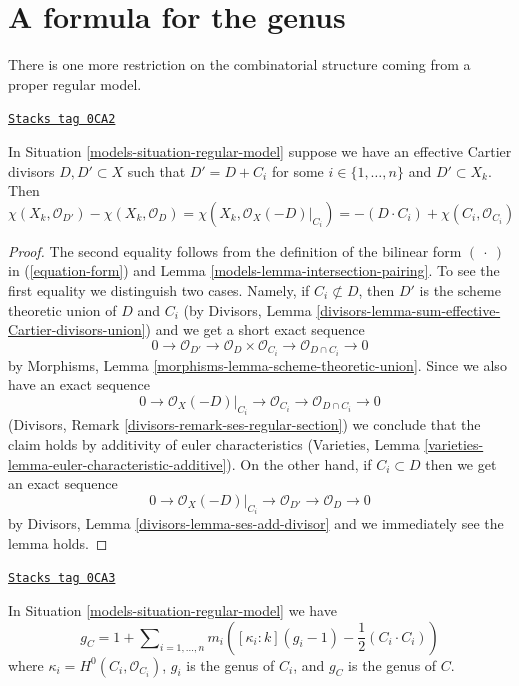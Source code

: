 \section{A formula for the genus}
\label{models-section-genus-formula}
There is one more restriction on the combinatorial structure
coming from a proper regular model.

\begin{lemma}
\label{models-lemma-add-component}
\href{https://stacks.math.columbia.edu/tag/0CA2}{\texttt{Stacks tag 0CA2}}

In Situation \ref{models-situation-regular-model} suppose we have an
effective Cartier divisors $D, D' \subset X$ such that
$D' = D + C_i$ for some $i \in \{1, \ldots, n\}$ and $D' \subset X_k$.
Then
$$
\chi(X_k, \mathcal{O}_{D'}) - \chi(X_k, \mathcal{O}_D) =
\chi(X_k, \mathcal{O}_X(-D)|_{C_i}) =
-(D \cdot C_i) + \chi(C_i, \mathcal{O}_{C_i})
$$
\end{lemma}

\begin{proof}

The second equality follows from the definition of the bilinear form
$(\ \cdot\ )$ in (\ref{equation-form}) and
Lemma \ref{models-lemma-intersection-pairing}. To see the first
equality we distinguish two cases.
Namely, if $C_i \not \subset D$, then $D'$ is the scheme
theoretic union of $D$ and $C_i$ (by
Divisors, Lemma \ref{divisors-lemma-sum-effective-Cartier-divisors-union})
and we get a short exact sequence
$$
0 \to \mathcal{O}_{D'} \to
\mathcal{O}_D \times \mathcal{O}_{C_i} \to
\mathcal{O}_{D \cap C_i} \to 0
$$
by Morphisms, Lemma \ref{morphisms-lemma-scheme-theoretic-union}.
Since we also have an exact sequence
$$
0 \to \mathcal{O}_X(-D)|_{C_i} \to
\mathcal{O}_{C_i} \to \mathcal{O}_{D \cap C_i} \to 0
$$
(Divisors, Remark \ref{divisors-remark-ses-regular-section})
we conclude that the claim holds
by additivity of euler characteristics
(Varieties, Lemma \ref{varieties-lemma-euler-characteristic-additive}).
On the other hand, if $C_i \subset D$ then we get an
exact sequence
$$
0 \to \mathcal{O}_X(-D)|_{C_i} \to \mathcal{O}_{D'} \to \mathcal{O}_D \to 0
$$
by Divisors, Lemma \ref{divisors-lemma-ses-add-divisor}
and we immediately see the lemma holds.
\end{proof}

\begin{lemma}
\label{models-lemma-genus-formula}
\href{https://stacks.math.columbia.edu/tag/0CA3}{\texttt{Stacks tag 0CA3}}

In Situation \ref{models-situation-regular-model} we have
$$
g_C = 1 + \sum\nolimits_{i = 1, \ldots, n}
m_i\left([\kappa_i : k] (g_i - 1) - \frac{1}{2}(C_i \cdot C_i)\right)
$$
where $\kappa_i = H^0(C_i, \mathcal{O}_{C_i})$,
$g_i$ is the genus of $C_i$, and $g_C$ is the genus of $C$.
\end{lemma}

